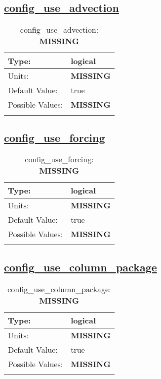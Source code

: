 \subsection[config\_use\_advection]{\hyperref[sec:nm_tab_use_sections]{config\_use\_advection}}
\label{subsec:nm_sec_config_use_advection}
\begin{center}
\begin{longtable}{| p{2.0in} || p{4.0in} |}
    \hline
    Type: & logical \\
    \hline
    Units: & {\bf \color{red} MISSING} \\
    \hline
    Default Value: & true \\
    \hline
    Possible Values: & {\bf \color{red} MISSING} \\
    \hline
    \caption{config\_use\_advection: {\bf \color{red} MISSING}}
\end{longtable}
\end{center}
\subsection[config\_use\_forcing]{\hyperref[sec:nm_tab_use_sections]{config\_use\_forcing}}
\label{subsec:nm_sec_config_use_forcing}
\begin{center}
\begin{longtable}{| p{2.0in} || p{4.0in} |}
    \hline
    Type: & logical \\
    \hline
    Units: & {\bf \color{red} MISSING} \\
    \hline
    Default Value: & true \\
    \hline
    Possible Values: & {\bf \color{red} MISSING} \\
    \hline
    \caption{config\_use\_forcing: {\bf \color{red} MISSING}}
\end{longtable}
\end{center}
\subsection[config\_use\_column\_package]{\hyperref[sec:nm_tab_use_sections]{config\_use\_column\_package}}
\label{subsec:nm_sec_config_use_column_package}
\begin{center}
\begin{longtable}{| p{2.0in} || p{4.0in} |}
    \hline
    Type: & logical \\
    \hline
    Units: & {\bf \color{red} MISSING} \\
    \hline
    Default Value: & true \\
    \hline
    Possible Values: & {\bf \color{red} MISSING} \\
    \hline
    \caption{config\_use\_column\_package: {\bf \color{red} MISSING}}
\end{longtable}
\end{center}
